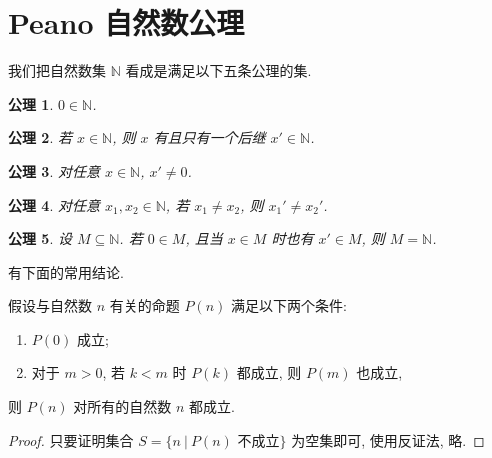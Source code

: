 \documentclass[
    mode=hazy,
    color=blue,
    device=normal,
    lang=cn
]{elegantnote}
\newtheorem{axiom}{公理}[section]
\begin{document}
    \section{Peano 自然数公理}
    我们把自然数集 $\mathbb{N}$ 看成是满足以下五条公理的集.
    \begin{axiom}
        $0\in\mathbb{N}$.
    \end{axiom}
    \begin{axiom}
        若 $x\in \mathbb{N}$, 则 $x$ 有且只有一个后继 $x'\in\mathbb{N}$.
    \end{axiom}
    \begin{axiom}
        对任意 $x\in\mathbb{N}$, $x'\neq0$.
    \end{axiom}
    \begin{axiom}
        对任意 $x_1,x_2\in \mathbb{N}$, 若 $x_1\neq x_2$, 则 $x_1'\neq x_2'$.
    \end{axiom}
    \begin{axiom}
        设 $M\subseteq \mathbb{N}$. 若 $0\in M$, 且当 $x\in M$ 时也有 $x'\in M$, 则 $M=\mathbb{N}$.
    \end{axiom}
    有下面的常用结论.
    \begin{theorem}[强归纳法]
        假设与自然数 $n$ 有关的命题 $P(n)$ 满足以下两个条件:
        \begin{enumerate}[label=$\arabic*^\circ$]
            \item $P(0)$ 成立;
            \item 对于 $m>0$, 若 $k<m$ 时 $P(k)$ 都成立, 则 $P(m)$ 也成立,
        \end{enumerate}
        则 $P(n)$ 对所有的自然数 $n$ 都成立.
    \end{theorem}
    \begin{proof}
        只要证明集合 $S=\{n\ \vert\ P(n)\text{ 不成立}\}$ 为空集即可, 使用反证法, 略.
    \end{proof}
\end{document}
